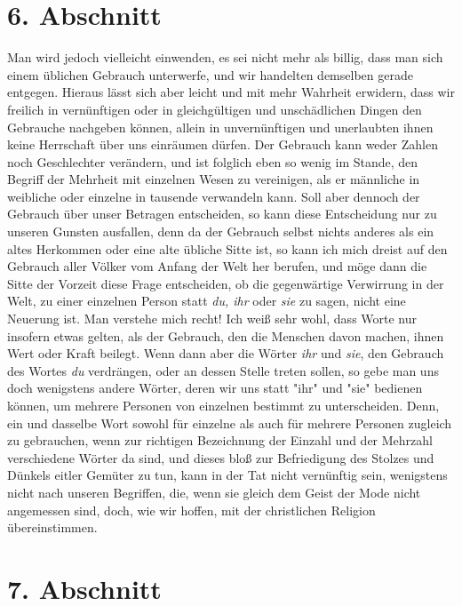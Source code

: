 \section{6. Abschnitt} \label{kap10_ab6}

Man wird jedoch vielleicht einwenden, es sei
nicht mehr als billig, dass man sich
einem üblichen Gebrauch unterwerfe, und wir handelten demselben gerade
entgegen. Hieraus lässt sich aber leicht und mit mehr Wahrheit erwidern, dass
wir freilich in vernünftigen oder in gleichgültigen und unschädlichen Dingen den
Gebrauche nachgeben können, allein in unvernünftigen und unerlaubten ihnen keine
Herrschaft über uns einräumen dürfen. Der Gebrauch kann weder Zahlen noch
Geschlechter verändern, und ist folglich eben so wenig im Stande, den Begriff
der Mehrheit mit einzelnen Wesen zu vereinigen, als er männliche in weibliche
oder einzelne in tausende verwandeln kann. Soll aber dennoch der Gebrauch über
unser Betragen entscheiden, so kann diese Entscheidung nur zu unseren Gunsten
ausfallen, denn da der Gebrauch selbst nichts anderes als ein altes Herkommen
oder eine alte übliche Sitte ist, so kann ich mich dreist auf den Gebrauch aller
Völker vom Anfang der Welt her berufen, und möge dann die Sitte der Vorzeit
diese Frage entscheiden, ob die gegenwärtige Verwirrung in der Welt, zu einer
einzelnen Person statt \textit{du, ihr} oder \textit{sie} zu sagen, nicht eine
Neuerung
ist.  Man verstehe mich recht! Ich weiß sehr wohl,
dass Worte nur insofern etwas
gelten, als der Gebrauch, den die Menschen davon machen, ihnen Wert oder Kraft
beilegt. Wenn dann aber die Wörter \textit{ihr} und \textit{sie}, den Gebrauch
des Wortes
\textit{du} verdrängen, oder an dessen Stelle treten sollen, so gebe man uns
doch
wenigstens andere Wörter, deren wir uns statt "ihr" und "sie" bedienen können, um
mehrere Personen von einzelnen bestimmt zu unterscheiden. Denn, ein und dasselbe
Wort sowohl für einzelne als auch für mehrere Personen zugleich zu gebrauchen,
wenn zur richtigen Bezeichnung der Einzahl und der Mehrzahl verschiedene Wörter
da sind, und dieses bloß zur Befriedigung des Stolzes und Dünkels eitler
Gemüter zu tun, kann in der Tat nicht vernünftig sein, wenigstens nicht nach
unseren Begriffen, die, wenn sie gleich dem Geist der Mode nicht angemessen
sind, doch, wie wir hoffen, mit der christlichen Religion übereinstimmen.

\section{7. Abschnitt} \label{kap10_ab7}

